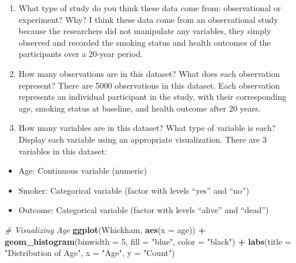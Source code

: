\documentclass[
]{article}
\newenvironment{Shaded}{\begin{snugshade}}{\end{snugshade}}
\newcommand{\AttributeTok}[1]{\textcolor[rgb]{0.13,0.29,0.53}{#1}}
\newcommand{\CommentTok}[1]{\textcolor[rgb]{0.56,0.35,0.01}{\textit{#1}}}
\newcommand{\DecValTok}[1]{\textcolor[rgb]{0.00,0.00,0.81}{#1}}
\newcommand{\FunctionTok}[1]{\textcolor[rgb]{0.13,0.29,0.53}{\textbf{#1}}}
\newcommand{\NormalTok}[1]{#1}
\newcommand{\SpecialCharTok}[1]{\textcolor[rgb]{0.81,0.36,0.00}{\textbf{#1}}}
\newcommand{\StringTok}[1]{\textcolor[rgb]{0.31,0.60,0.02}{#1}}
\providecommand{\tightlist}{%
  \setlength{\itemsep}{0pt}\setlength{\parskip}{0pt}}
\begin{document}
\begin{enumerate}
\def\labelenumi{\arabic{enumi}.}
\item
  What type of study do you think these data come from: observational or
  experiment? Why? I think these data come from an observational study
  because the researchers did not manipulate any variables, they simply
  observed and recorded the smoking status and health outcomes of the
  participants over a 20-year period.
\item
  How many observations are in this dataset? What does each observation
  represent? There are 5000 observations in this dataset. Each
  observation represents an individual participant in the study, with
  their corresponding age, smoking status at baseline, and health
  outcome after 20 years.
\item
  How many variables are in this dataset? What type of variable is each?
  Display each variable using an appropriate visualization. There are 3
  variables in this dataset:
\end{enumerate}

\begin{itemize}
\tightlist
\item
  Age: Continuous variable (numeric)
\item
  Smoker: Categorical variable (factor with levels ``yes'' and ``no'')
\item
  Outcome: Categorical variable (factor with levels ``alive'' and
  ``dead'')
\end{itemize}

\begin{Shaded}
\begin{Highlighting}[]
\CommentTok{\# Visualizing Age}
\FunctionTok{ggplot}\NormalTok{(Whickham, }\FunctionTok{aes}\NormalTok{(}\AttributeTok{x =}\NormalTok{ age)) }\SpecialCharTok{+}
  \FunctionTok{geom\_histogram}\NormalTok{(}\AttributeTok{binwidth =} \DecValTok{5}\NormalTok{, }\AttributeTok{fill =} \StringTok{"blue"}\NormalTok{, }\AttributeTok{color =} \StringTok{"black"}\NormalTok{) }\SpecialCharTok{+}
  \FunctionTok{labs}\NormalTok{(}\AttributeTok{title =} \StringTok{"Distribution of Age"}\NormalTok{, }\AttributeTok{x =} \StringTok{"Age"}\NormalTok{, }\AttributeTok{y =} \StringTok{"Count"}\NormalTok{)}
\end{Highlighting}
\end{Shaded}
\end{document}
